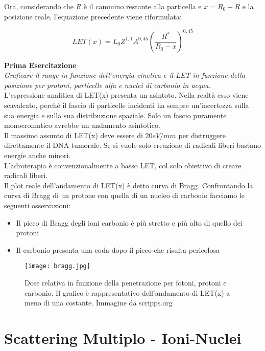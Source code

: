 \documentclass [a4paper, twoside] {book}
\begin{document}
Ora, considerando che $R$ è il cammino restante alla particella e $x=R_0-R$ e la posizione reale, l'equazione precedente viene riformulata:

\begin{equation}
LET(x)=L_0Z^{1,1}A^{0,45}(\frac{R^*}{R_0-x})^{0,45}
\end{equation}

\textbf{Prima Esercitazione}\\
\emph{Graficare il range in funzione dell'energia cinetica e il LET in funzione della posizione per protoni, particelle alfa e nuclei di carbonio in acqua.}\\

L'espressione analitica di LET(x) presenta un asintoto. Nella realtà esso viene scavalcato, perché il fascio di particelle incidenti ha sempre un'incertezza sulla sua energia e sulla sua distribuzione spaziale. Solo un fascio puramente monocromatico avrebbe un andamento asintotico. \\

Il massimo assunto di LET(x) deve essere di $20 eV/mm$ per distruggere direttamente il DNA tumorale. Se si vuole solo creazione di radicali liberi bastano energie anche minori.\\

L'adroterapia è convenzionalmente a basso LET, col solo obiettivo di creare radicali liberi. \\

Il plot reale dell'andamento di LET(x) è detto curva di Bragg. Confrontando la curva di Bragg di un protone con quella di un nucleo di carbonio facciamo le seguenti osservazioni:

\begin{itemize}
\item Il picco di Bragg degli ioni carbonio è più stretto e più alto di quello dei protoni
\item Il carbonio presenta una coda dopo il picco che risulta pericolosa
\end{itemize}

\begin{figure}[]
\centering
	\texttt{[image: bragg.jpg]}
	\caption{Dose relativa in funzione della penetrazione per fotoni, protoni e carbonio. Il grafico è rappresentativo dell'andamento di LET(x) a meno di una costante. Immagine da scripps.org}
	\label{fig:bragg}
\end{figure}


\section{Scattering Multiplo - Ioni-Nuclei}
\end{document}
